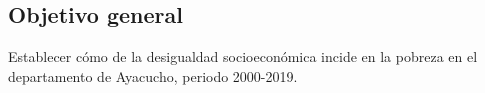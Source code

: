 \subsection{Objetivo general}

Establecer cómo de la desigualdad socioeconómica incide en la pobreza en el departamento de Ayacucho, periodo 2000-2019.

	
	
	
